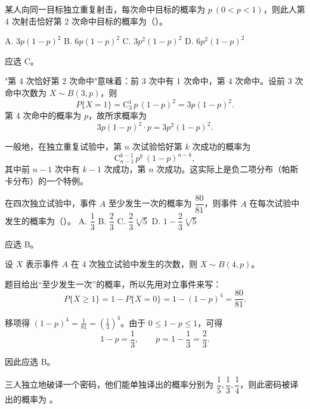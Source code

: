 ﻿\documentclass[lang=cn,11pt]{elegantbook}
\begin{document}
\begin{exercise}\label{exer:1-20}
某人向同一目标独立重复射击，每次命中目标的概率为 \(p\ (0<p<1)\)，则此人第 4 次射击恰好第 2 次命中目标的概率为（\quad）。\par
A. \(3p(1-p)^2\)\quad
B. \(6p(1-p)^2\)\quad
C. \(3p^2(1-p)^2\)\quad
D. \(6p^2(1-p)^2\)
\end{exercise}

\begin{solution}
应选 C。

"第 4 次恰好第 2 次命中"意味着：前 3 次中有 1 次命中，第 4 次命中。设前 3 次命中次数为 \(X \sim B(3,p)\)，则
\[
P\{X=1\} = \mathrm{C}_3^1\, p\,(1-p)^2 = 3p(1-p)^2.
\]
第 4 次命中的概率为 \(p\)，故所求概率为
\[
3p(1-p)^2 \cdot p = 3p^2(1-p)^2.
\]
\end{solution}

\begin{note}
一般地，在独立重复试验中，第 \(n\) 次试验恰好第 \(k\) 次成功的概率为
\[
\mathrm{C}_{n-1}^{k-1}\, p^k\, (1-p)^{n-k},
\]
其中前 \(n-1\) 次中有 \(k-1\) 次成功，第 \(n\) 次成功。这实际上是负二项分布（帕斯卡分布）的一个特例。
\end{note}

\begin{exercise}\label{exer:1-25}
在四次独立试验中，事件 \(A\) 至少发生一次的概率为 \(\dfrac{80}{81}\)，则事件 \(A\) 在每次试验中发生的概率为（\quad）。\quad 
A. \(\dfrac{1}{3}\)\quad
B. \(\dfrac{2}{3}\)\quad
C. \(\dfrac{2}{3}\sqrt[4]{5}\)\quad
D. \(1 - \dfrac{2}{3}\sqrt[4]{5}\)
\end{exercise}

\begin{solution}
应选 B。

设 \(X\) 表示事件 \(A\) 在 4 次独立试验中发生的次数，则 \(X\sim B(4,p)\)。

题目给出“至少发生一次”的概率，所以先用对立事件来写：
\[
P\{X\ge 1\}=1-P\{X=0\}=1-(1-p)^4=\frac{80}{81}.
\]

移项得 \((1-p)^4=\frac{1}{81}=\left(\frac13\right)^4\)。由于 \(0\le 1-p\le 1\)，可得
\[
1-p=\frac13,\qquad p=1-\frac13=\frac23.
\]

因此应选 B。
\end{solution}

\begin{exercise}\label{exer:1-44}
三人独立地破译一个密码，他们能单独译出的概率分别为 \(\dfrac{1}{5},\dfrac{1}{3},\dfrac{1}{4}\)，则此密码被译出的概率为 \underline{\hspace{2cm}}。
\end{exercise}
\end{document}
